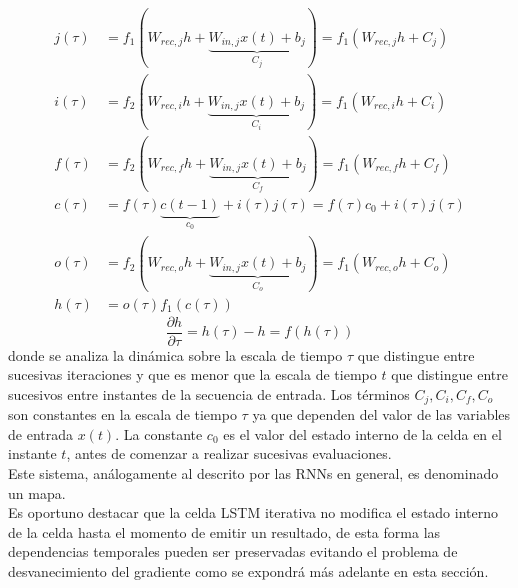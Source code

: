\documentclass{article}
\begin{document}
	\begin{equation*}
	\begin{split}
	j(\tau) &= f_1(W_{rec, j} h + \underbrace{W_{in, j} x(t) + b_{j}}_{C_j} ) =  f_1(W_{rec, j} h + C_j)\\
	i(\tau) &= f_2(W_{rec, i} h + \underbrace{W_{in, j} x(t) + b_{j}}_{C_i} ) =  f_1(W_{rec, i} h + C_i)\\
	f(\tau) &= f_2(W_{rec, f} h + \underbrace{W_{in, j} x(t) + b_{j}}_{C_f} ) =  f_1(W_{rec, f} h + C_f)\\
	c(\tau) &= f(\tau)\underbrace{c(t-1)}_{c_0} + i(\tau)j(\tau) = f(\tau) c_0 + i(\tau)j(\tau) \\
	o(\tau)& = f_2(W_{rec, o} h + \underbrace{W_{in, j} x(t) + b_{j}}_{C_o} ) =  f_1(W_{rec, o} h + C_o)\\
	h(\tau) &= o(\tau)f_1(c(\tau))
	\end{split}
	\end{equation*}
	\begin{equation}\label{iterativeLSTMdynamics}
	\dfrac{\partial h}{\partial \tau} = h(\tau) - h = f(h(\tau))
	\end{equation}
	donde se analiza la dinámica sobre la escala de tiempo $\tau$ que distingue entre sucesivas iteraciones y que es menor que la escala de tiempo $t$ que distingue entre sucesivos entre instantes de la secuencia de entrada. Los términos $C_j, C_i, C_f, C_o$ son constantes en la escala de tiempo $\tau$ ya que dependen del valor de las variables de entrada $x(t)$. La constante $c_0$ es el valor del estado interno de la celda en el instante $t$, antes de comenzar a realizar sucesivas evaluaciones. \\
	Este sistema, análogamente al descrito por las RNNs en general, es denominado un mapa.\\
	Es oportuno destacar que la celda LSTM iterativa no modifica el estado interno de la celda hasta el momento de emitir un resultado, de esta forma las dependencias temporales pueden ser preservadas evitando el problema de desvanecimiento del gradiente como se expondrá más adelante en esta sección.\\
	
\end{document}
